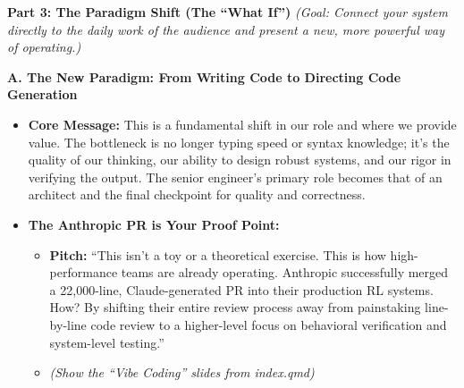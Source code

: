 \documentclass[
  ignorenonframetext,
  aspectratio=169,
]{beamer}
\providecommand{\tightlist}{%
  \setlength{\itemsep}{0pt}\setlength{\parskip}{0pt}}
\begin{document}
\begin{frame}{\textbf{Part 3: The Paradigm Shift (The ``What If'')}}
\label{part-3-the-paradigm-shift-the-what-if}
\emph{(Goal: Connect your system directly to the daily work of the
audience and present a new, more powerful way of operating.)}

\begin{block}{\textbf{A. The New Paradigm: From Writing Code to
Directing Code Generation}}
\label{a.-the-new-paradigm-from-writing-code-to-directing-code-generation}
\begin{itemize}
\tightlist
\item
  \textbf{Core Message:} This is a fundamental shift in our role and
  where we provide value. The bottleneck is no longer typing speed or
  syntax knowledge; it's the quality of our thinking, our ability to
  design robust systems, and our rigor in verifying the output. The
  senior engineer's primary role becomes that of an architect and the
  final checkpoint for quality and correctness.\\
\item
  \textbf{The Anthropic PR is Your Proof Point:}

  \begin{itemize}
  \tightlist
  \item
    \textbf{Pitch:} ``This isn't a toy or a theoretical exercise. This
    is how high-performance teams are already operating. Anthropic
    successfully merged a 22,000-line, Claude-generated PR into their
    production RL systems. How? By shifting their entire review process
    away from painstaking line-by-line code review to a higher-level
    focus on behavioral verification and system-level testing.''\\
  \item
    \emph{(Show the ``Vibe Coding'' slides from index.qmd)}
  \end{itemize}
\end{itemize}
\end{block}


\end{frame}
\end{document}
